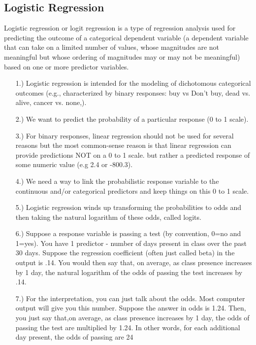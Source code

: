\documentclass[a4paper,12pt]{article}
\begin{document}
\subsection{Logistic Regression}
Logistic regression or logit regression is a type of regression analysis used for predicting
the outcome of a categorical dependent variable (a dependent variable that can take on a limited number of values,
whose magnitudes are not meaningful but whose ordering of magnitudes may or may not be meaningful)
based on one or more predictor variables.



\begin{itemize}
	\item[1.)] Logistic regression is intended for the modeling
	of dichotomous categorical outcomes (e.g., characterized by binary responses: buy vs Don't buy, dead vs. alive, cancer vs. none,).
	
	
	\item[2.)] We want to predict the probability of a particular response  (0 to 1 scale).
	
	\item[3.)] For binary responses, linear regression should not be used for several reasons
	but the most common-sense reason is that linear regression can provide predictions NOT on a 0 to 1 scale.
	but rather a predicted response of some numeric value (e.g 2.4 or -800.3).
	
	\item[4.)] We need a way to link the probabilistic response variable to the continuous and/or categorical predictors and
	keep things on this 0 to 1 scale.
	
	\item[5.)] Logistic regression winds up transforming the probabilities to odds and then taking the natural logarithm of these odds, called logits.
	
	
	\item[6.)] Suppose a response variable is passing a test (by convention, 0=no and 1=yes).
	You have 1 predictor - number of days present in class over the past 30 days.
	Suppose the regression coefficient (often just called beta) in the output is .14.
	You would then say that, on average, as class presence increases by 1 day, the natural logarithm of the
	odds of passing the test increases by .14.
	
	\item[7.)] For the interpretation, you can just talk about the odds.
	Most computer output will give you this number.
	Suppose the answer in odds is 1.24. Then, you just say that,on average, as class presence increases by 1 day,
	the odds of passing the test are multiplied by 1.24.
	In other words, for each additional day present, the odds of passing are 24%
	

\end{itemize}
\end{document}
